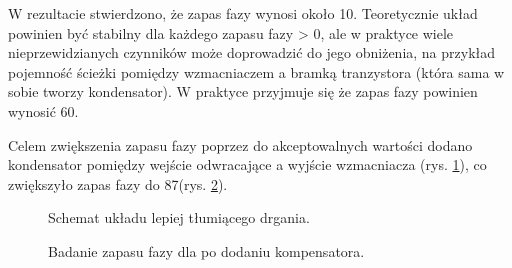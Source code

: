 \documentclass[polish,engineer]{polsl-msth}
\begin{document}
W rezultacie stwierdzono, że zapas fazy wynosi około 10\degree. Teoretycznie układ powinien być stabilny dla każdego zapasu fazy > 0\degree, ale w praktyce wiele nieprzewidzianych czynników może doprowadzić do jego obniżenia, na przykład pojemność ścieżki pomiędzy wzmacniaczem a bramką tranzystora (która sama w sobie tworzy kondensator). W praktyce przyjmuje się że zapas fazy powinien wynosić 60\degree \cite{PhaseMargin_TERRELL1996383}.

Celem zwiększenia zapasu fazy poprzez do akceptowalnych wartości dodano kondensator pomiędzy wejście odwracające a wyjście wzmacniacza (rys. \ref{img:HereYouAreMrCap}), co zwiększyło zapas fazy do 87\degree (rys. \ref{img:MrBodeWithCap}).
\begin{figure}[hbtp]
    \centering
     \caption{Schemat układu lepiej tłumiącego drgania. \label{img:HereYouAreMrCap}}
\end{figure}
\begin{figure}[hbtp]
     \caption{Badanie zapasu fazy dla po dodaniu kompensatora. \label{img:MrBodeWithCap}}
\end{figure}
\end{document}
